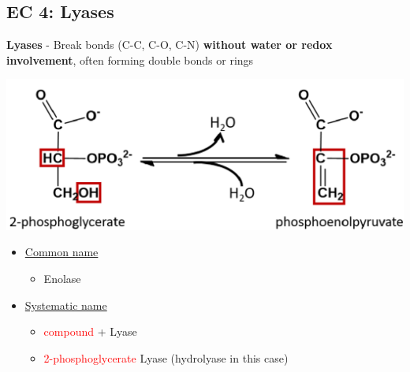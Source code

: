 \documentclass[10pt]{article}
\begin{document}
\subsection*{EC 4: Lyases}
\textbf{Lyases} - Break bonds (C-C, C-O, C-N) \textbf{without water or redox involvement}, often forming double bonds or rings
\begin{center}
    \includegraphics*[width=\textwidth]{L2_6.png} 
\end{center}
\begin{itemize}
    \item \underline{Common name}
    \begin{itemize}
        \item Enolase
    \end{itemize}
    \item \underline{Systematic name}
    \begin{itemize}
        \item \textcolor{red}{compound} + Lyase
        \item \textcolor{red}{2-phosphoglycerate} Lyase (hydrolyase in this case)
    \end{itemize}
\end{itemize}
\end{document}
